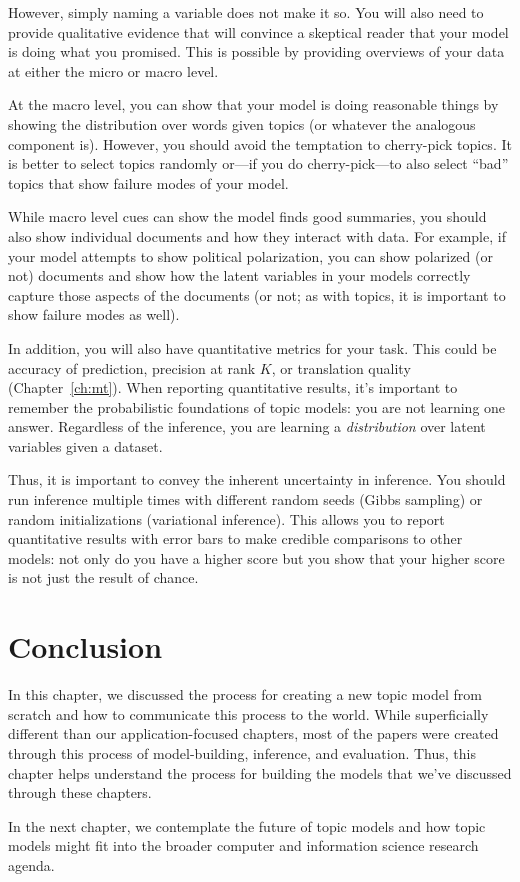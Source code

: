 However, simply naming a variable does not make it so.  You will also
need to provide qualitative evidence that will convince a skeptical
reader that your model is doing what you promised.  This is possible
by providing overviews of your data at either the micro or macro
level.

At the macro level, you can show that your model is doing reasonable
things by showing the distribution over words given topics (or
whatever the analogous component is).  However, you should avoid the
temptation to cherry-pick topics.  It is better to select topics
randomly or---if you do cherry-pick---to also select ``bad'' topics
that show failure modes of your model.

While macro level cues can show the model finds good summaries, you
should also show individual documents and how they interact with
data.  For example, if your model attempts to show political
polarization, you can show polarized (or not) documents and show how
the latent variables in your models correctly capture those aspects of
the documents (or not; as with topics, it is important to show failure
modes as well).

In addition, you will also have quantitative metrics for your task.
This could be accuracy of prediction, precision at rank $K$, or
translation quality (Chapter~\ref{ch:mt}).  When reporting quantitative
results, it's important to remember the probabilistic foundations of
topic models: you are not learning one answer.  Regardless of the
inference, you are learning a \emph{distribution} over latent
variables given a dataset.

Thus, it is important to convey the inherent uncertainty in inference.
You should run inference multiple times with different random seeds
(Gibbs sampling) or random initializations (variational inference).
This allows you to report quantitative results with error bars to make
credible comparisons to other models: not only do you have a higher
score but you show that your higher score is not just the result of
chance.

\section{Conclusion}

In this chapter, we discussed the process for creating a new topic
model from scratch and how to communicate this process to the world.
While superficially different than our application-focused chapters,
most of the papers were created through this process of
model-building, inference, and evaluation.  Thus, this chapter helps
understand the process for building the models that we've discussed
through these chapters.

In the next chapter, we contemplate the future of topic models and how
topic models might fit into the broader computer and information
science research agenda.
